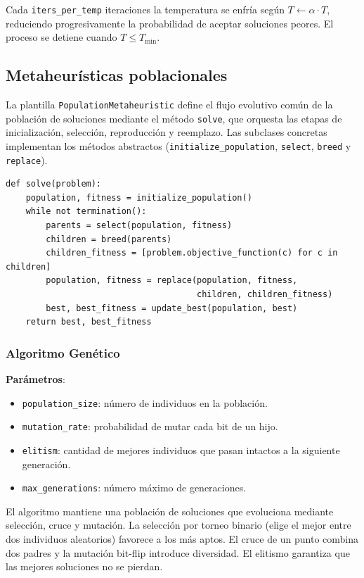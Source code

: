 \documentclass[letterpaper, 12pt]{report}
\begin{document}
Cada \texttt{iters\_per\_temp} iteraciones la temperatura se enfría según \(T \leftarrow \alpha \cdot T\), reduciendo progresivamente la probabilidad de aceptar soluciones peores.
El proceso se detiene cuando \(T \le T_{\min}\).


\subsection{Metaheurísticas poblacionales}

La plantilla \texttt{PopulationMetaheuristic} define el flujo evolutivo común de la población de soluciones mediante el método \texttt{solve}, que orquesta las etapas de inicialización, selección, reproducción y reemplazo. Las subclases concretas implementan los métodos abstractos (\texttt{initialize\_population}, \texttt{select}, \texttt{breed} y \texttt{replace}).

\begin{verbatim}
def solve(problem):
    population, fitness = initialize_population()
    while not termination():
        parents = select(population, fitness)
        children = breed(parents)
        children_fitness = [problem.objective_function(c) for c in children]
        population, fitness = replace(population, fitness,
                                      children, children_fitness)
        best, best_fitness = update_best(population, best)
    return best, best_fitness
\end{verbatim}


\subsubsection{Algoritmo Genético}

\textbf{Parámetros}:
\begin{itemize}
    \item \texttt{population\_size}: número de individuos en la población.
    \item \texttt{mutation\_rate}: probabilidad de mutar cada bit de un hijo.
    \item \texttt{elitism}: cantidad de mejores individuos que pasan intactos a la siguiente generación.
    \item \texttt{max\_generations}: número máximo de generaciones.
\end{itemize}

El algoritmo mantiene una población de soluciones que evoluciona mediante selección, cruce y mutación. La selección por torneo binario (elige el mejor entre dos individuos aleatorios) favorece a los más aptos. El cruce de un punto combina dos padres y la mutación bit-flip introduce diversidad. El elitismo garantiza que las mejores soluciones no se pierdan. 
\end{document}

